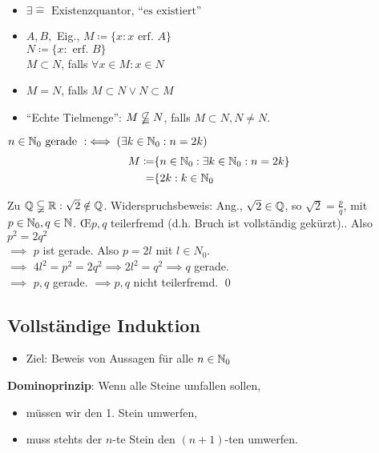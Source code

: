\documentclass[consecutivenumbering]{gadsescript}
\begin{document}
\begin{itemize}
	\item $\exists \hat= \text{ Existenzquantor, ``es existiert''}$
	\item $ A, B, $ Eig., $M\coloneqq \{ x : x \text{ erf. } A \}$\\
		$N \coloneqq \{ x : \text{ erf. } B \} $\\
	$ M \subset N$, falls $ \forall x \in M : x \in N $
	\item $ M = N $, falls $ M \subset N \vee N \subset M $
	\item ``Echte Tielmenge'': $ M \nsubseteqq N$, falls $ M \subset N, N \neq N.$
\end{itemize}

\begin{subexample}
	$ n \in \mathbb{N}_0 \text{ gerade } :\iff ( \exists k \in \mathbb{N}_0 : n = 2k) $
	\begin{align}
		M \coloneqq &\{ n \in \mathbb{N}_0 : \exists k \in \mathbb{N}_0 : n = 2k \}\\
		=&\{2k : k \in \mathbb{N}_0
	\end{align}
\end{subexample}

\begin{example}[$ \N \subsetneqq \N_0 \subsetneqq \Z \subsetneqq \Q \subsetneqq \R $]
	Zu $ \mathbb{Q} \subsetneqq \mathbb{R} : \sqrt{2} \notin \mathbb{Q} $. Widerspruchsbeweis: Ang.,
	$ \sqrt{2} \in \mathbb{Q} $, so $ \sqrt{2} = \frac{p}{q} $, mit $ p \in \mathbb{N}_0, q \in \mathbb{N} $. \OE $ p, q $ teilerfremd (d.h. Bruch ist vollständig gekürzt).. Also $ p^2 = 2q^2 $\\
	$\implies$ $ p $ ist gerade. Also $ p = 2l $ mit $l \in N_0$.\\
	$\implies$ $ 4l^2 = p^2 = 2q^2 \implies 2l^2 = q^2 \implies q $ gerade.\\
	$ \implies $ $ p, q $ gerade. $ \implies p, q $ nicht teilerfremd. \qed
\end{example}

\subsection{Vollständige Induktion}
\begin{itemize}
	\item Ziel: Beweis von Aussagen für alle $ n \in \mathbb{N}_0 $
\end{itemize}
\textbf{Dominoprinzip}: Wenn alle Steine umfallen sollen,
\begin{itemize}
	\item müssen wir den 1. Stein umwerfen,
	\item muss stehts der $n$-te Stein den $(n+1)$-ten umwerfen.
\end{itemize}
\end{document}
